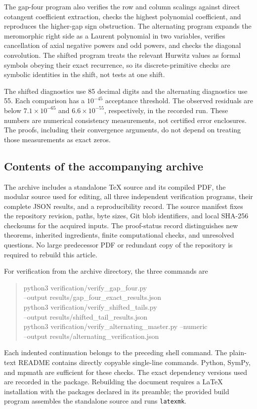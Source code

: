 \documentclass[11pt]{article}
\theoremstyle{definition}
\theoremstyle{remark}
\numberwithin{equation}{section}
\begin{document}
The gap-four program also verifies the row and column scalings
against direct cotangent coefficient extraction, checks the highest
polynomial coefficient, and reproduces the higher-gap sign obstruction.
The alternating program expands the meromorphic right side as a
Laurent polynomial in two variables, verifies cancellation of axial
negative powers and odd powers, and checks the diagonal convolution.
The shifted program treats the relevant Hurwitz values as formal
symbols obeying their exact recurrence, so its discrete-primitive
checks are symbolic identities in the shift, not tests at one shift.

The shifted diagnostics use 85 decimal digits and the alternating
diagnostics use 55. Each comparison has a $10^{-45}$ acceptance
threshold. The observed residuals are below $7.1\times10^{-65}$ and
$6.6\times10^{-55}$, respectively, in the recorded run. These numbers
are numerical consistency measurements, not certified error
enclosures. The proofs, including their convergence arguments, do not
depend on treating those measurements as exact zeros.

\subsection{Contents of the accompanying archive}

The archive includes a standalone TeX source and its compiled PDF,
the modular source used for editing, all three independent verification
programs, their complete JSON results, and a reproducibility record.
The source manifest fixes the repository revision, paths, byte sizes,
Git blob identifiers, and local SHA-256 checksums for the acquired
inputs. The proof-status record distinguishes new theorems,
inherited ingredients, finite computational checks, and unresolved
questions. No large predecessor PDF or redundant copy of the
repository is required to rebuild this article.

For verification from the archive directory, the three commands are
\begin{quote}\small\ttfamily
python3 verification/verify\_gap\_four.py\\
\hspace*{1em}--output results/gap\_four\_exact\_results.json\\[4pt]
python3 verification/verify\_shifted\_tails.py\\
\hspace*{1em}--output results/shifted\_tail\_results.json\\[4pt]
python3 verification/verify\_alternating\_master.py --numeric\\
\hspace*{1em}--output results/alternating\_verification.json
\end{quote}
Each indented continuation belongs to the preceding shell command.
The plain-text README contains directly copyable single-line commands.
Python, SymPy, and mpmath are sufficient for these checks. The exact
dependency versions used are recorded in the package. Rebuilding the
document requires a LaTeX installation with the packages declared in
its preamble; the provided build program assembles the standalone
source and runs \texttt{latexmk}.
\end{document}

